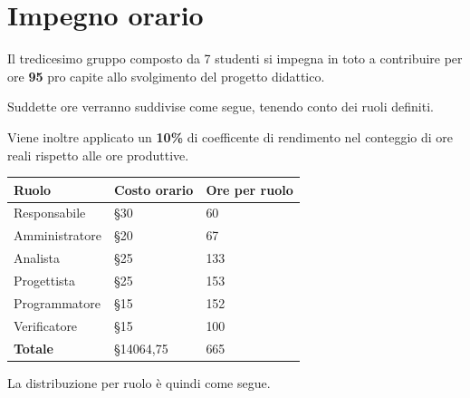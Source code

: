 \section{Impegno orario}

Il tredicesimo gruppo composto da 7 studenti si impegna in toto a contribuire per ore \textbf{95} pro capite allo svolgimento del progetto didattico.

Suddette ore verranno suddivise come segue, tenendo conto dei ruoli definiti.

Viene inoltre applicato un \textbf{10\%} di coefficente di rendimento nel conteggio di ore reali rispetto alle ore produttive.

\begin{center}
    \begin{tabularx}{10cm}{X |l|l}          
        \textbf{Ruolo} & \textbf{Costo orario} & \textbf{Ore per ruolo}\\
        \hline
        Responsabile & §30 & 60\\
        Amministratore & §20 & 67\\
        Analista & §25 & 133\\
        Progettista & §25 & 153\\
        Programmatore & §15 & 152\\
        Verificatore & §15 & 100\\
        \hline
        \textbf{Totale} & §14064,75 & 665
    \end{tabularx}
\end{center}

La distribuzione per ruolo è quindi come segue.

